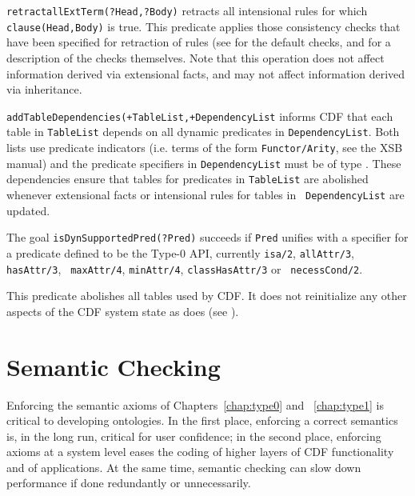 \begin{description}
{\tt retractallExtTerm(?Head,?Body)} retracts all intensional rules for
which {\tt clause(Head,Body)} is true.  This predicate applies those
consistency checks that have been specified for retraction of rules
(see  for the default checks, and
 for a description of the checks themselves.  Note
that this operation does not affect information derived via
extensional facts, and may not affect information derived via
inheritance.

{\tt addTableDependencies(+TableList,+DependencyList} informs CDF that
each table in {\tt TableList} depends on all dynamic predicates in
{\tt DependencyList}.  Both lists use predicate indicators (i.e. terms
of the form {\tt Functor/Arity}, see the XSB manual) and the predicate
specifiers in {\tt DependencyList} must be of type
.  These dependencies ensure that
tables for predicates in {\tt TableList} are abolished whenever
extensional facts or intensional rules for tables in {\tt
DependencyList} are updated.

The goal {\tt isDynSupportedPred(?Pred)} succeeds if {\tt Pred}
unifies with a specifier for a predicate defined to be the Type-0 API,
currently {\tt isa/2}, {\tt allAttr/3}, {\tt hasAttr/3}, {\tt
maxAttr/4}, {\tt minAttr/4}, {\tt classHasAttr/3} or {\tt
necessCond/2}.

This predicate abolishes all tables used by CDF.  It does not
reinitialize any other aspects of the CDF system state as does
 (see ).


\end{description}

\section{Semantic Checking} \label{sec:consist}

Enforcing the semantic axioms of Chapters~\ref{chap:type0} and
~\ref{chap:type1} is critical to developing ontologies.  In the first
place, enforcing a correct semantics is, in the long run, critical for
user confidence; in the second place, enforcing axioms at a system
level eases the coding of higher layers of CDF functionality and of
applications.  At the same time, semantic checking can slow down
performance if done redundantly or unnecessarily.

